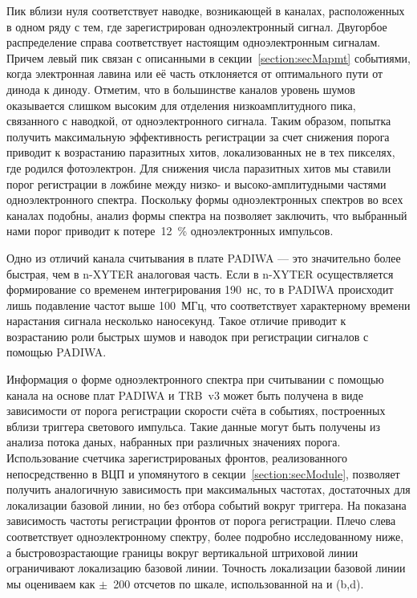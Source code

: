 Пик вблизи нуля соответствует наводке, возникающей в каналах, расположенных в одном ряду с тем, где зарегистрирован одноэлектронный сигнал. Двугорбое распределение справа соответствует настоящим одноэлектронным сигналам. Причем левый пик связан с описанными в секции~\ref{section:secMapmt} событиями, когда электронная лавина или её часть отклоняется от оптимального пути от динода к диноду. Отметим, что в большинстве каналов уровень шумов оказывается слишком высоким для отделения низкоамплитудного пика, связанного с наводкой, от одноэлектронного сигнала. Таким образом, попытка получить максимальную эффективность регистрации за счет снижения порога приводит к возрастанию паразитных хитов, локализованных не в тех пикселях, где родился фотоэлектрон. Для снижения числа паразитных хитов мы ставили порог регистрации в ложбине между низко- и высоко-амплитудными частями одноэлектронного спектра. Поскольку формы одноэлектронных спектров во всех каналах подобны, анализ формы спектра на  позволяет заключить, что выбранный нами порог приводит к потере~12~\% одноэлектронных импульсов.

Одно из отличий канала считывания в плате PADIWA --- это значительно более быстрая, чем в n-XYTER аналоговая часть. Если в n-XYTER осуществляется формирование со временем интегрирования 190~нс, то в PADIWA происходит лишь подавление частот выше 100~МГц, что соответствует характерному времени нарастания сигнала несколько наносекунд. Такое отличие приводит к возрастанию роли быстрых шумов и наводок при регистрации сигналов с помощью PADIWA.

Информация о форме одноэлектронного спектра при считывании с помощью канала на основе плат PADIWA и TRB~v3 может быть получена в виде зависимости от порога регистрации скорости счёта в событиях, построенных вблизи триггера светового импульса. Такие данные могут быть получены из анализа потока даных, набранных при различных значениях порога. Использование счетчика зарегистрированых фронтов, реализованного непосредственно в ВЦП и упомянутого в секции~\ref{section:secModule}, позволяет получить аналогичную зависимость при максимальных частотах, достаточных для локализации базовой линии, но без отбора событий вокруг триггера. На  показана зависимость частоты регистрации фронтов от порога регистрации. Плечо слева соответствует одноэлектронному спектру, более подробно исследованному ниже, а быстровозрастающие границы вокруг вертикальной штриховой линии ограничивают локализацию базовой линии. Точность локализации базовой линии мы оцениваем как $ \pm $~200 отсчетов по шкале, использованной на  и (b,d).

